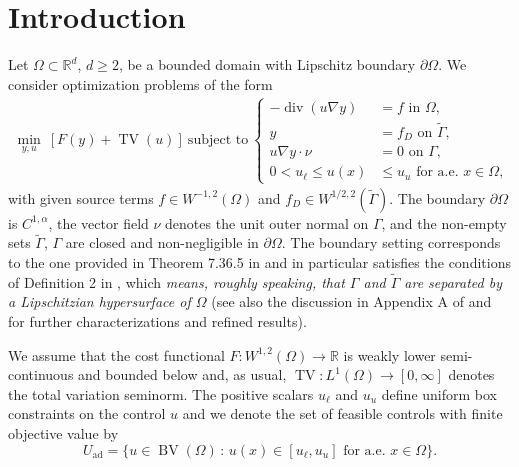 \documentclass[11pt]{article}
\newcommand{\R}{\mathbb{R}}
\DeclareMathOperator*{\BV}{BV}
\DeclareMathOperator*{\TV}{TV}
\DeclareMathOperator*{\dvg}{div}
\newcommand{\feas}{U_{\textrm{ad}}}
\theoremstyle{definition}
\theoremstyle{remark}
\begin{document}
\section{Introduction}\label{sec:introduction}
%
Let $\Omega \subset \R^d$, $d \ge 2$, be a bounded domain with Lipschitz boundary $\partial \Omega$. We consider optimization problems of the form
%
\begin{gather}\label{eq:p}
 \min_{y,u}\ [F(y) + \TV(u)]
\ \text{subject to}\ 
\left\{
\begin{aligned}
- \dvg(  u \nabla y) &= f \text{ in } \Omega, \\
y &= f_D \text{ on } \tilde{\Gamma}, \\
 u \nabla y \cdot \nu  &= 0  \text{ on } \Gamma, \\
0 < u_\ell \le u(x) &\le u_u \text{ for a.e.\ }x \in \Omega,
\end{aligned}
\right.%
\tag{P}
\end{gather}
%
with given source terms $f \in W^{-1,2}(\Omega)$ and  $f_D \in W^{1/2,2} (\tilde{\Gamma})$.
The boundary $\partial \Omega$ is $C^{1,\alpha}$, the vector field $\nu$ denotes the unit outer normal on ${\Gamma}$, and the non-empty sets
$\tilde{\Gamma}$, $\Gamma$ are
closed and non-negligible in $\partial \Omega$.
The boundary setting corresponds to the one provided in Theorem 7.36.5
in \cite{medkova2018laplace} and in particular
satisfies the conditions
of Definition 2 in \cite{groger1989aw}, which
\emph{means, roughly speaking, that $\Gamma$ and 
$\tilde{\Gamma}$ are separated by a Lipschitzian 
hypersurface of $\Omega$} \cite{groger1989aw} 
(see also the discussion in Appendix A of 
\cite{clason2018total} and
\cite{haller2009holder,rehberg2015holder,haller2024holder} 
for further characterizations and refined results). 

We assume that the cost functional $F : W^{1,2}(\Omega) \to \R$ is weakly lower semi-continuous and bounded below
and, as usual, $\TV : L^1(\Omega) \to [0,\infty]$ denotes the total variation seminorm.
The positive scalars $u_\ell$ and $u_u$ define uniform box constraints on the control  $u$
and we denote the set of feasible controls with finite objective value by
%
\[ \feas = \{ u \in \BV(\Omega)\,:\, u(x) \in [u_\ell,u_u] \text{ for a.e.\ }x \in \Omega \}. \]
\end{document}
